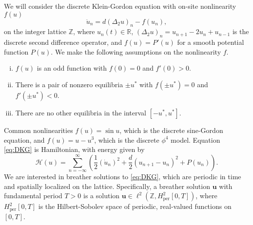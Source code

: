 \documentclass[12pt,reqno]{amsart}
\def\R{{\mathbb R}}
\def\Z{{\mathbb Z}}
\def\per{\textrm{per}}
\newcommand{\uvec}{\mathbf{u}}
\begin{document}
We will consider the discrete Klein-Gordon equation with on-site nonlinearity $f(u)$
\begin{equation}\label{eq:DKG}
\ddot{u}_n = d (\Delta_2 u)_n - f(u_n),
\end{equation}
on the integer lattice $\Z$, where $u_n(t) \in \R$, $(\Delta_2 u)_n = u_{n+1} - 2 u_n + u_{n-1}$ is the discrete second difference operator, and $f(u) = P'(u)$ for a smooth potential function $P(u)$. We make the following assumptions on the nonlinearity $f$. 
\begin{enumerate}[(i)]
	\item $f(u)$ is an odd function with $f(0) = 0$ and $f'(0) > 0$.
	\item There is a pair of nonzero equilibria $\pm u^*$ with $f(\pm u^*) = 0$ and $f'(\pm u^*) < 0$.
	\item There are no other equilibria in the interval $[-u^*, u^*]$.
\end{enumerate}
Common nonlinearities $f(u) = \sin u$, which is the discrete sine-Gordon equation, and $f(u) = u - u^3$, which is the discrete $\phi^4$ model. Equation \cref{eq:DKG} is Hamiltonian, with energy given by \cite{KevrekidisWeinstein2000}
\begin{equation}\label{eq:H}
	\mathcal{H}(u) = \sum_{n=-\infty}^\infty 
	\left( \frac{1}{2} (\dot{u}_n)^2 + \frac{d}{2} (u_{n+1} - u_n)^2 + P(u_n) \right).
\end{equation}
We are interested in breather solutions to \cref{eq:DKG}, which are periodic in time and spatially localized on the lattice. Specifically, a breather solution $\uvec$ with fundamental period $T>0$ is a solution $\uvec \in \ell^2(\Z, H^2_\per[0,T])$, where $H^2_\per[0,T]$ is the Hilbert-Sobolev space of periodic, real-valued functions on $[0,T]$.
\end{document}
